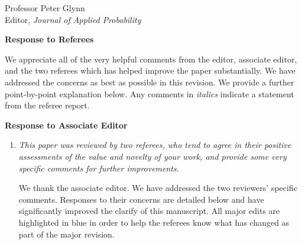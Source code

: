 \documentclass[11pt]{letter} %
\begin{document}

\begin{letter}{Professor
	Peter Glynn\\
	Editor, {\em Journal of Applied Probability}}



\signature{Walter Dempsey\\
University of Michigan\\
Department of Biostatistics\\
1415 Washington Heights\\
Ann Arbor, MI 48103} %


\vspace{5mm}

\newpage

{\bf Response to Referees}

We appreciate all of the very helpful comments from the editor, associate editor, and the two referees which has helped improve the paper substantially. We have addressed the concerns as best as possible in this revision. We provide a further point-by-point explanation below. Any comments in {\it italics} indicate a statement from the referee report.

{\bf Response to Associate Editor}
\begin{enumerate}
\item {\it This paper was reviewed by two referees, who tend to agree in their positive assessments of the value and novelty of your work, and provide some very specific comments for further improvements.}

\vspace{5mm}
We thank the associate editor.  We have addressed the two reviewers' specific comments.  Responses to their concerns are detailed below and have significantly improved the clarify of this manuscript.   All major edits are highlighted in blue in order to help the referees know what has changed as part of the major revision.
\vspace{5mm}


\end{enumerate}
\end{letter}
\end{document}
